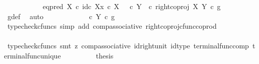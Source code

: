 \begin{isabellebody}
\ \ \ \ \ \ \ \ \ \ {\isacharequal}{\kern0pt}\ {\isacharparenleft}{\kern0pt}eq{\isacharunderscore}{\kern0pt}pred\ X\ {\isasymcirc}\isactrlsub c\ {\isasymlangle}id\isactrlsub c\ X{\isacharcomma}{\kern0pt}x\ {\isasymcirc}\isactrlsub c\ {\isasymbeta}\isactrlbsub X\isactrlesub {\isasymrangle}{\isacharparenright}{\kern0pt}\ {\isasymamalg}\ {\isacharparenleft}{\kern0pt}{\isasymf}\ {\isasymcirc}\isactrlsub c\ {\isasymbeta}\isactrlbsub Y\isactrlesub {\isacharparenright}{\kern0pt}\ \ {\isasymcirc}\isactrlsub c\ right{\isacharunderscore}{\kern0pt}coproj\ X\ Y\ {\isasymcirc}\isactrlsub c\ g{\isachardoublequoteclose}\isanewline
\ \ \ \ \ \ \ \ \isamarkupfalse%
\ g{\isacharunderscore}{\kern0pt}def\ \isamarkupfalse%
\ auto\isanewline
\ \ \ \ \ \ \isamarkupfalse%
\ \isamarkupfalse%
\ {\isachardoublequoteopen}{\isachardot}{\kern0pt}{\isachardot}{\kern0pt}{\isachardot}{\kern0pt}\ {\isacharequal}{\kern0pt}\ {\isacharparenleft}{\kern0pt}{\isasymf}\ {\isasymcirc}\isactrlsub c\ {\isasymbeta}\isactrlbsub Y\isactrlesub {\isacharparenright}{\kern0pt}\ {\isasymcirc}\isactrlsub c\ g{\isachardoublequoteclose}\isanewline
\ \ \ \ \ \ \ \ \isamarkupfalse%
\ {\isacharparenleft}{\kern0pt}typecheck{\isacharunderscore}{\kern0pt}cfuncs{\isacharcomma}{\kern0pt}\ simp\ add{\isacharcolon}{\kern0pt}\ comp{\isacharunderscore}{\kern0pt}associative{}\ right{\isacharunderscore}{\kern0pt}coproj{\isacharunderscore}{\kern0pt}cfunc{\isacharunderscore}{\kern0pt}coprod{\isacharparenright}{\kern0pt}\isanewline
\ \ \ \ \ \ \isamarkupfalse%
\ \isamarkupfalse%
\ {\isachardoublequoteopen}{\isachardot}{\kern0pt}{\isachardot}{\kern0pt}{\isachardot}{\kern0pt}\ {\isacharequal}{\kern0pt}\ {\isasymf}{\isachardoublequoteclose}\isanewline
\ \ \ \ \ \ \ \ \isamarkupfalse%
\ {\isacharparenleft}{\kern0pt}typecheck{\isacharunderscore}{\kern0pt}cfuncs{\isacharcomma}{\kern0pt}\ smt\ {\isacharparenleft}{\kern0pt}z{}{\isacharparenright}{\kern0pt}\ comp{\isacharunderscore}{\kern0pt}associative{}\ id{\isacharunderscore}{\kern0pt}right{\isacharunderscore}{\kern0pt}unit{}\ id{\isacharunderscore}{\kern0pt}type\ terminal{\isacharunderscore}{\kern0pt}func{\isacharunderscore}{\kern0pt}comp\ terminal{\isacharunderscore}{\kern0pt}func{\isacharunderscore}{\kern0pt}unique{\isacharparenright}{\kern0pt}\isanewline
\ \ \ \ \ \ \isamarkupfalse%
\ \isamarkupfalse%
\ {\isacharquery}{\kern0pt}thesis\isanewline
\ \ \ \ \ \ \ \ \isamarkupfalse%

\end{isabellebody}
